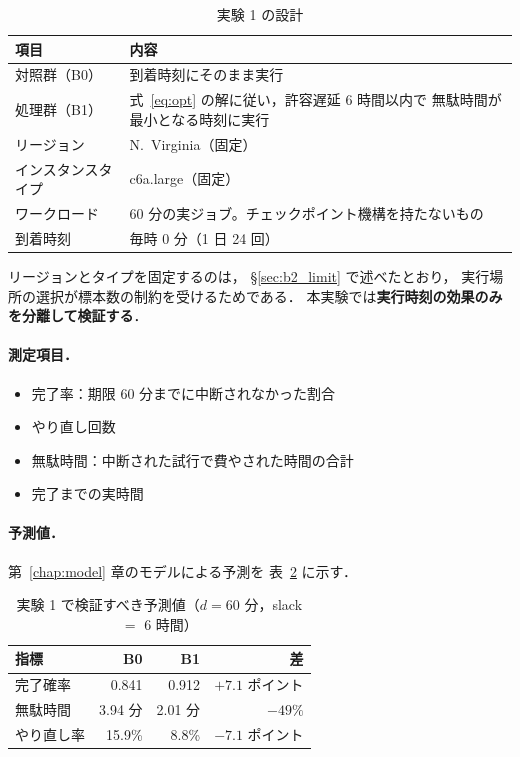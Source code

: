 \documentclass[11pt,a4paper]{ltjsreport}
\begin{document}
\begin{table}[htbp]
\centering
\caption{実験 1 の設計}
\label{tab:exp1}
\small
\begin{tabularx}{\textwidth}{@{}lX@{}}
\toprule
項目 & 内容 \\
\midrule
対照群（B0） & 到着時刻にそのまま実行 \\
処理群（B1） & 式~\eqref{eq:opt} の解に従い，許容遅延 6 時間以内で
               無駄時間が最小となる時刻に実行 \\
\addlinespace
リージョン & N.~Virginia（固定） \\
インスタンスタイプ & c6a.large（固定） \\
ワークロード & 60 分の実ジョブ。チェックポイント機構を持たないもの \\
到着時刻 & 毎時 0 分（1 日 24 回） \\
\bottomrule
\end{tabularx}
\end{table}

リージョンとタイプを固定するのは，
\S\ref{sec:b2_limit} で述べたとおり，
実行場所の選択が標本数の制約を受けるためである．
本実験では\textbf{実行時刻の効果のみを分離して検証する}．

\paragraph{測定項目．}

\begin{itemize}
  \item 完了率：期限 60 分までに中断されなかった割合
  \item やり直し回数
  \item 無駄時間：中断された試行で費やされた時間の合計
  \item 完了までの実時間
\end{itemize}

\paragraph{予測値．}
第~\ref{chap:model} 章のモデルによる予測を
表~\ref{tab:prediction} に示す．

\begin{table}[htbp]
\centering
\caption{実験 1 で検証すべき予測値（$d = 60$ 分，slack $=$ 6 時間）}
\label{tab:prediction}
\small
\begin{tabular}{@{}lrrr@{}}
\toprule
指標 & B0 & B1 & 差 \\
\midrule
完了確率 & 0.841 & 0.912 & $+7.1$ ポイント \\
無駄時間 & 3.94 分 & 2.01 分 & $-49\%$ \\
やり直し率 & 15.9\% & 8.8\% & $-7.1$ ポイント \\
\bottomrule
\end{tabular}
\end{table}
\end{document}
